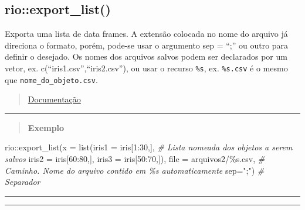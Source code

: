 \documentclass[
]{book}
\newenvironment{Shaded}{\begin{snugshade}}{\end{snugshade}}
\newcommand{\AttributeTok}[1]{\textcolor[rgb]{0.77,0.63,0.00}{#1}}
\newcommand{\CommentTok}[1]{\textcolor[rgb]{0.56,0.35,0.01}{\textit{#1}}}
\newcommand{\DecValTok}[1]{\textcolor[rgb]{0.00,0.00,0.81}{#1}}
\newcommand{\FunctionTok}[1]{\textcolor[rgb]{0.00,0.00,0.00}{#1}}
\newcommand{\NormalTok}[1]{#1}
\newcommand{\SpecialCharTok}[1]{\textcolor[rgb]{0.00,0.00,0.00}{#1}}
\newcommand{\StringTok}[1]{\textcolor[rgb]{0.31,0.60,0.02}{#1}}
\theoremstyle{definition}
\theoremstyle{definition}
\theoremstyle{definition}
\theoremstyle{definition}
\theoremstyle{remark}
\begin{document}
\hypertarget{rioexport_list}{%
\subsection{rio::export\_list()}\label{rioexport_list}}

Exporta uma lista de data frames. A extensão colocada no nome do arquivo já direciona o formato, porém, pode-se usar o argumento sep = ``;'' ou outro para definir o desejado. Os nomes dos arquivos salvos podem ser declarados por um vetor, ex. c(``iris1.csv'',``iris2.csv''), ou usar o recurso \texttt{\%s}, ex. \texttt{\%s.csv} é o mesmo que \texttt{nome\_do\_objeto.csv}.

\begin{quote}
\href{https://www.rdocumentation.org/packages/rio/versions/0.5.26/topics/export_list}{Documentação}
\end{quote}

\begin{center}\rule{0.5\linewidth}{0.5pt}\end{center}

\begin{quote}
\textbf{Exemplo}
\end{quote}

\begin{Shaded}
\begin{Highlighting}[]
\NormalTok{rio}\SpecialCharTok{::}\FunctionTok{export\_list}\NormalTok{(}\AttributeTok{x =} \FunctionTok{list}\NormalTok{(}\AttributeTok{iris1 =}\NormalTok{ iris[}\DecValTok{1}\SpecialCharTok{:}\DecValTok{30}\NormalTok{,],   }\CommentTok{\# Lista nomeada dos objetos a serem salvos}
                          \AttributeTok{iris2 =}\NormalTok{ iris[}\DecValTok{60}\SpecialCharTok{:}\DecValTok{80}\NormalTok{,],}
                          \AttributeTok{iris3 =}\NormalTok{ iris[}\DecValTok{50}\SpecialCharTok{:}\DecValTok{70}\NormalTok{,]),}
                 \AttributeTok{file =} \StringTok{\textquotesingle{}arquivos2/\%s.csv\textquotesingle{}}\NormalTok{,      }\CommentTok{\# Caminho. Nome do arquivo contido em \%s automaticamente}
                 \AttributeTok{sep=}\StringTok{";"}\NormalTok{)     }\CommentTok{\# Separador}
\end{Highlighting}
\end{Shaded}

\begin{center}\rule{0.5\linewidth}{0.5pt}\end{center}

\begin{center}\rule{0.5\linewidth}{0.5pt}\end{center}
\end{document}
